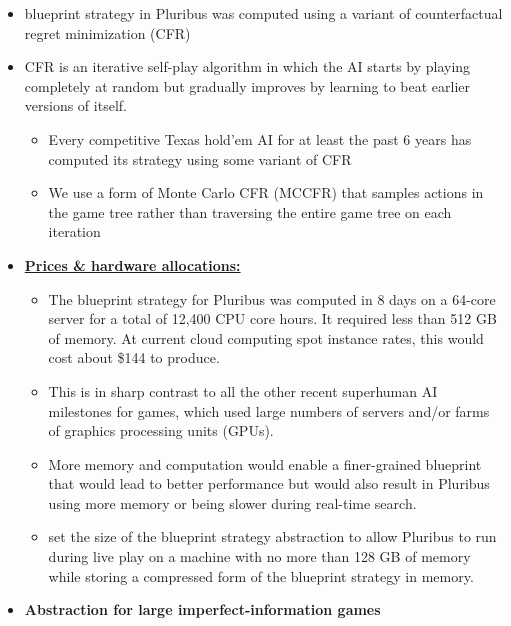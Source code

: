 \documentclass[
]{article}
\begin{document}
\begin{itemize}
  \begin{itemize}
  \item
    \textbf{\ul{(PHASE 1)}} Pluribus's self-play produces a strategy for
    the entire game offline, which we refer to as the blueprint
    strategy.

    \begin{itemize}
    \item
      Then during actual play against opponents, \textbf{\ul{(PHASE 2)}}
      Pluribus improves upon the blueprint strategy by searching for a
      better strategy in real time for the situations in which it finds
      itself during the game.
    \end{itemize}
  \end{itemize}
\item
  blueprint strategy in Pluribus was computed using a variant of
  counterfactual regret minimization (CFR)
\item
  CFR is an iterative self-play algorithm in which the AI starts by
  playing completely at random but gradually improves by learning to
  beat earlier versions of itself.

  \begin{itemize}
  \item
    Every competitive Texas hold'em AI for at least the past 6 years has
    computed its strategy using some variant of CFR
  \item
    We use a form of Monte Carlo CFR (MCCFR) that samples actions in the
    game tree rather than traversing the entire game tree on each
    iteration
  \end{itemize}
\item
  \textbf{\ul{Prices \& hardware allocations:}}

  \begin{itemize}
  \item
    The blueprint strategy for Pluribus was computed in 8 days on a
    64-core server for a total of 12,400 CPU core hours. It required
    less than 512 GB of memory. At current cloud computing spot instance
    rates, this would cost about \$144 to produce.
  \item
    This is in sharp contrast to all the other recent superhuman AI
    milestones for games, which used large numbers of servers and/or
    farms of graphics processing units (GPUs).
  \item
    More memory and computation would enable a finer-grained blueprint
    that would lead to better performance but would also result in
    Pluribus using more memory or being slower during real-time search.
  \item
    set the size of the blueprint strategy abstraction to allow Pluribus
    to run during live play on a machine with no more than 128 GB of
    memory while storing a compressed form of the blueprint strategy in
    memory.
  \end{itemize}
\item
  \textbf{Abstraction for large imperfect-information games}


\end{itemize}
\end{document}
